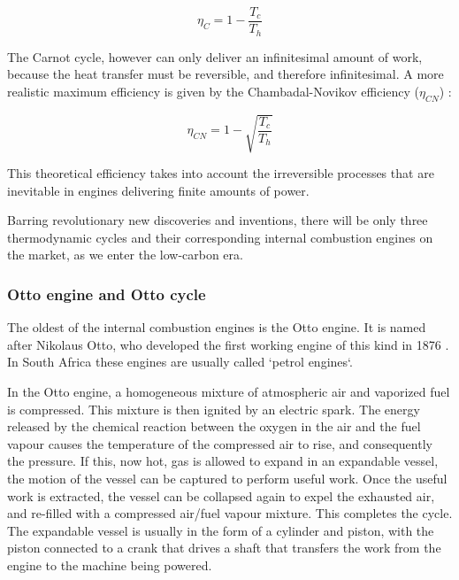 \begin{equation}
	\eta_{C} = 1 - \frac{T_c}{T_h}
\label{eqn:Carnot}
\end{equation}

The Carnot cycle, however can only deliver an infinitesimal amount of work,
because the heat transfer must be reversible, and therefore infinitesimal. A
more realistic maximum efficiency is given by the Chambadal-Novikov efficiency
(\(\eta_{CN}\)) \autocite{Hoffmann2008}:

\begin{equation}
	\eta_{CN} = 1 - \sqrt{\frac{T_c}{T_h}}
\label{eqn:Chambadal-Novikov}
\end{equation}

This theoretical efficiency takes into account the irreversible processes that
are inevitable in engines delivering finite amounts of power.

Barring revolutionary new discoveries and inventions, there will be only three
thermodynamic cycles and their corresponding internal combustion engines on the
market, as we enter the low-carbon era.

\subsubsection{Otto engine and Otto cycle}

The oldest of the internal combustion engines is the Otto engine. It is named
after Nikolaus Otto, who developed the first working engine of this kind in 1876
\autocite[Chapter 9]{Cummins1989}. In South Africa these engines are usually
called `petrol engines`.

In the Otto engine, a homogeneous mixture of atmospheric air and vaporized fuel
is compressed. This mixture is then ignited by an electric spark. The energy
released by the chemical reaction between the oxygen in the air and the fuel
vapour causes the temperature of the compressed air to rise, and consequently
the pressure. If this, now hot, gas is allowed to expand in an expandable
vessel, the motion of the vessel can be captured to perform useful work. Once
the useful work is extracted, the vessel can be collapsed again to expel the
exhausted air, and re-filled with a compressed air/fuel vapour mixture. This completes
the cycle. The expandable vessel is usually in the form of a cylinder and
piston, with the piston connected to a crank that drives a shaft that transfers
the work from the engine to the machine being powered. 

